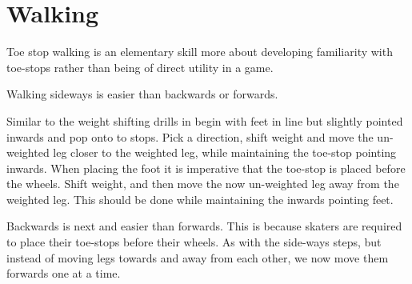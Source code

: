 \section{Walking}
\label{sec:toe_stop/walking}

Toe stop walking is an elementary skill more about developing familiarity with toe-stops rather than being of direct utility in a game.    


Walking sideways is easier than backwards or forwards. 

Similar to the weight shifting drills in \Cref{\label{drill:toe_stop/weight_shift}} begin with feet in line but slightly pointed inwards and pop onto to stops.
Pick a direction, shift weight and move the un-weighted leg closer to the weighted leg, while maintaining the toe-stop pointing inwards.
When placing the foot it is imperative that the toe-stop is placed before the wheels.
Shift weight, and then move the now un-weighted leg away from the weighted leg. 
This should be done while maintaining the inwards pointing feet. 



Backwards is next and easier than forwards.
This is because skaters are required to place their toe-stops before their wheels.  
As with the side-ways steps, but instead of moving legs towards and away from each other, we now move them forwards one at a time.


